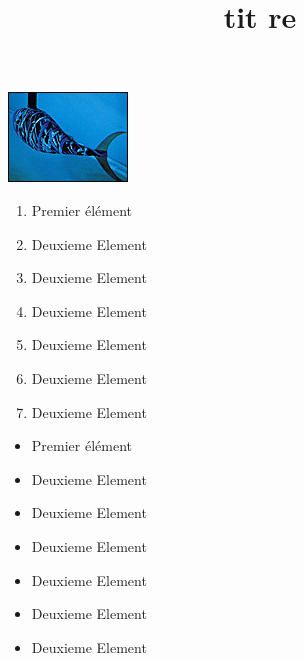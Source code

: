 \documentclass{article}
\title{tit re}
\begin{document}
\maketitle

\includegraphics{../tex/pic.jpg}
\begin{enumerate}
\item Premier élément
\item Deuxieme Element
\item Deuxieme Element
\item Deuxieme Element
\item Deuxieme Element
\item Deuxieme Element
\item Deuxieme Element
\end{enumerate}


\begin{itemize}
\item Premier élément
\item Deuxieme Element
\item Deuxieme Element
\item Deuxieme Element
\item Deuxieme Element
\item Deuxieme Element
\item Deuxieme Element
                       \end{itemize}
\end{document}
